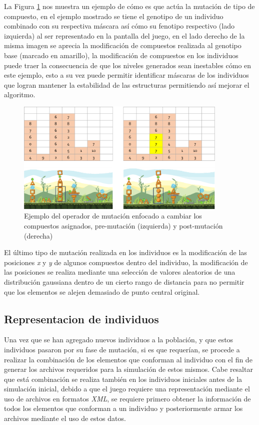 La Figura \ref{figure:mutate_composite} nos muestra un ejemplo de cómo es que
actúa la mutación de tipo de compuesto, en el ejemplo mostrado se tiene el
genotipo de un individuo combinado con su respectiva máscara así cómo su
fenotipo respectivo (lado izquierda) al ser representado en la pantalla del
juego, en el lado derecho de la misma imagen se aprecia la modificación de
compuestos realizada al genotipo base (marcado en amarillo), la modificación de
compuestos en los individuos puede traer la consecuencia de que los niveles
generados sean inestables cómo en este ejemplo, esto a su vez puede permitir
identificar máscaras de los individuos que logran mantener la estabilidad de las
estructuras permitiendo así mejorar el algoritmo.

\begin{figure}
  \centering
  \includegraphics[width=0.9\textwidth]{img/mutation_composite.png}
  \caption{Ejemplo del operador de mutación enfocado a cambiar los compuestos asignados, pre-mutación (izquierda) y post-mutación (derecha)}
  \label{figure:mutate_composite}
\end{figure}

El último tipo de mutación realizada en los individuos es la modificación de las
posiciones \textit{x} y \textit{y} de algunos compuestos dentro del individuo,
la modificación de las posiciones se realiza mediante una selección de valores
aleatorios de una distribución gaussiana dentro de un cierto rango de distancia
para no permitir que los elementos se alejen demasiado de punto central
original.

\subsection{Representacion de individuos}
\label{section:individual_representation}

Una vez que se han agregado nuevos individuos a la población, y que estos
individuos pasaron por su fase de mutación, si es que requerían, se procede a
realizar la combinación de los elementos que conforman al individuo con el fin
de generar los archivos requeridos para la simulación de estos mismos. Cabe
resaltar que está combinación se realiza también en los individuos iniciales
antes de la simulación inicial, debido a que el juego requiere una
representación mediante el uso de archivos en formatos \textit{XML}, se requiere
primero obtener la información de todos los elementos que conforman a un
individuo y posteriormente armar los archivos mediante el uso de estos datos.

